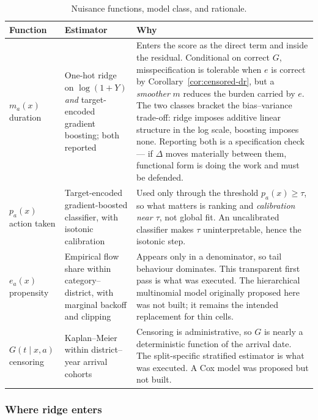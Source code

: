 \documentclass[11pt,a4paper]{article}
\theoremstyle{plain}
\theoremstyle{definition}
\theoremstyle{remark}
\begin{document}
\begin{table}[h]
\centering
\caption{Nuisance functions, model class, and rationale.}
\label{tab:models}
\begin{tabular}{p{2.2cm}p{3.1cm}p{8.5cm}}
\toprule
Function & Estimator & Why\\
\midrule
$m_a(x)$ \newline duration &
One-hot ridge on $\log(1+Y)$ \emph{and} target-encoded gradient boosting; both reported &
Enters the score as the direct term and inside the residual. Conditional on correct $G$,
misspecification is tolerable when $e$ is correct by Corollary~\ref{cor:censored-dr}, but a
\emph{smoother} $m$ reduces the burden carried by $e$. The two
classes bracket the bias--variance trade-off: ridge imposes additive linear structure in the log
scale, boosting imposes none. Reporting both is a specification check --- if $\Delta$ moves
materially between them, functional form is doing the work and must be defended.\\
\addlinespace
$p_a(x)$ \newline action taken &
Target-encoded gradient-boosted classifier, with isotonic calibration &
Used only through the threshold $p_a(x)\ge\tau$, so what matters is ranking and
\emph{calibration near $\tau$}, not global fit. An uncalibrated classifier makes $\tau$
uninterpretable, hence the isotonic step.\\
\addlinespace
$e_a(x)$ \newline propensity &
Empirical flow share within category--district, with marginal backoff and clipping &
Appears only in a denominator, so tail behaviour dominates. This transparent first pass is what
was executed. The hierarchical multinomial model originally proposed here was not built; it
remains the intended replacement for thin cells.\\
\addlinespace
$G(t\mid x,a)$ \newline censoring &
Kaplan--Meier within district--year arrival cohorts &
Censoring is administrative, so $G$ is nearly a deterministic function of the arrival date.
The split-specific stratified estimator is what was executed. A Cox model was proposed but not
built.\\
\bottomrule
\end{tabular}
\end{table}

\subsubsection{Where ridge enters}
\end{document}
